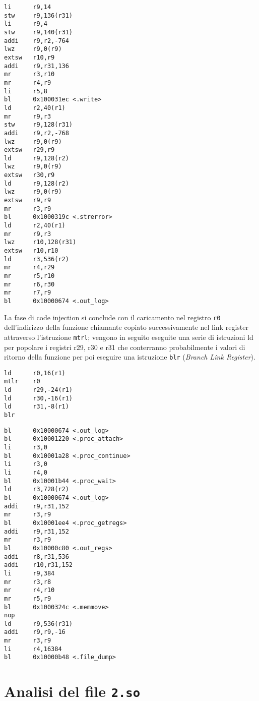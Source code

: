 \documentclass[10pt,a4paper, titlepage]{report}
\begin{document}
\begin{lstlisting}
li      r9,14
stw     r9,136(r31)
li      r9,4
stw     r9,140(r31)
addi    r9,r2,-764
lwz     r9,0(r9)
extsw   r10,r9
addi    r9,r31,136
mr      r3,r10
mr      r4,r9
li      r5,8
bl      0x100031ec <.write>
ld      r2,40(r1)
mr      r9,r3
stw     r9,128(r31)
addi    r9,r2,-768
lwz     r9,0(r9)
extsw   r29,r9
ld      r9,128(r2)
lwz     r9,0(r9)
extsw   r30,r9
ld      r9,128(r2)
lwz     r9,0(r9)
extsw   r9,r9
mr      r3,r9
bl      0x1000319c <.strerror>
ld      r2,40(r1)
mr      r9,r3
lwz     r10,128(r31)
extsw   r10,r10
ld      r3,536(r2)
mr      r4,r29
mr      r5,r10
mr      r6,r30
mr      r7,r9
bl      0x10000674 <.out_log>
\end{lstlisting}

La fase di code injection si conclude con il caricamento nel registro \texttt{r0} dell'indirizzo della funzione chiamante copiato successivamente nel link register attraverso l'istruzione \texttt{mtrl}; vengono in seguito eseguite una serie di istruzioni ld per popolare i registri r29, r30 e r31 che conterranno probabilmente i valori di ritorno della funzione per poi eseguire una istruzione \texttt{blr} (\textit{Branch Link Register}).

\begin{lstlisting}
ld      r0,16(r1)
mtlr    r0
ld      r29,-24(r1)
ld      r30,-16(r1)
ld      r31,-8(r1)
blr
\end{lstlisting}


\begin{lstlisting}
bl      0x10000674 <.out_log>
bl      0x10001220 <.proc_attach>
li      r3,0
bl      0x10001a28 <.proc_continue>
li      r3,0
li      r4,0
bl      0x10001b44 <.proc_wait>
ld      r3,728(r2)
bl      0x10000674 <.out_log>
addi    r9,r31,152
mr      r3,r9
bl      0x10001ee4 <.proc_getregs>
addi    r9,r31,152
mr      r3,r9
bl      0x10000c80 <.out_regs>
addi    r8,r31,536
addi    r10,r31,152
li      r9,384
mr      r3,r8
mr      r4,r10
mr      r5,r9
bl      0x1000324c <.memmove>
nop
ld      r9,536(r31)
addi    r9,r9,-16
mr      r3,r9
li      r4,16384
bl      0x10000b48 <.file_dump>
\end{lstlisting}
















\section{Analisi del file \texttt{2.so}}\label{sec:2.so}
\end{document}
